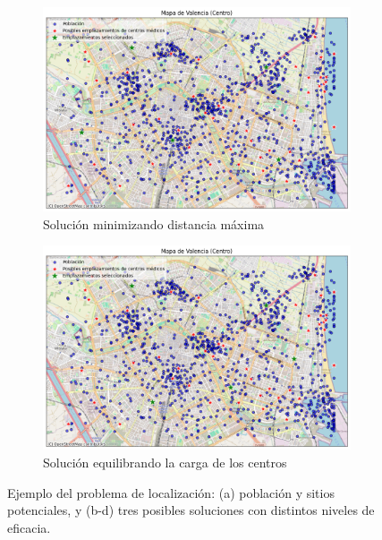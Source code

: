 \documentclass[12pt,a4paper]{book}
\begin{document}
\begin{figure}[H]
    \begin{subfigure}{0.48\textwidth}
        \includegraphics[width=\textwidth]{images/min_distancias.png}
        \caption{Solución minimizando distancia máxima}
        \label{fig:min_distancias}
    \end{subfigure}
    \hfill
    \begin{subfigure}{0.48\textwidth}
        \includegraphics[width=\textwidth]{images/equilibrada.png}
        \caption{Solución equilibrando la carga de los centros}
        \label{fig:equilibrada}
    \end{subfigure}
    
    \caption{Ejemplo del problema de localización: (a) población y sitios potenciales, y (b-d) tres posibles soluciones con distintos niveles de eficacia.}
    \label{fig:casos_ejemplo}
\end{figure}
\end{document}
